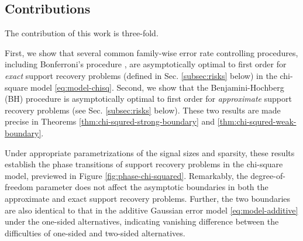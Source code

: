 \subsection{Contributions}

The contribution of this work is three-fold.

First, we show that several common family-wise error rate controlling procedures, including Bonferroni's procedure \cite{dunn1961multiple}, are asymptotically optimal to first order for \emph{exact} support recovery problems (defined in Sec. \ref{subsec:risks} below) in the chi-square model \eqref{eq:model-chisq}.
Second, we show that the Benjamini-Hochberg (BH) procedure \cite{benjamini1995controlling} is asymptotically optimal to first order for \emph{approximate} support recovery problems (see Sec. \ref{subsec:risks} below).
These two results are made precise in Theorems \ref{thm:chi-squred-strong-boundary} and \ref{thm:chi-squred-weak-boundary}.

Under appropriate parametrizations of the signal sizes and sparsity, these results establish the phase transitions of support recovery problems in the chi-square model, previewed in Figure \ref{fig:phase-chi-squared}.
Remarkably, the degree-of-freedom parameter does not affect the asymptotic boundaries in both the approximate and exact support recovery problems.
Further, the two boundaries are also identical to that in the additive Gaussian error model \eqref{eq:model-additive} under the one-sided alternatives, indicating vanishing difference between the difficulties of one-sided and two-sided alternatives.

